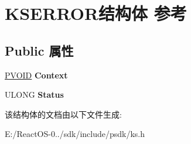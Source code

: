 \hypertarget{struct_k_s_e_r_r_o_r}{}\section{K\+S\+E\+R\+R\+O\+R结构体 参考}
\label{struct_k_s_e_r_r_o_r}
\subsection*{Public 属性}
\begin{DoxyCompactItemize}
\item 
\mbox{\label{struct_k_s_e_r_r_o_r_a802844a8d1ebb6cc20e209863befcc3e}} 
\hyperlink{interfacevoid}{P\+V\+O\+ID} {\bfseries Context}
\item 
\mbox{\label{struct_k_s_e_r_r_o_r_a476520f0a02ef6d4a4b8585c4e215b37}} 
U\+L\+O\+NG {\bfseries Status}
\end{DoxyCompactItemize}


该结构体的文档由以下文件生成\+:\begin{DoxyCompactItemize}
\item 
E\+:/\+React\+O\+S-\/0../sdk/include/psdk/ks.\+h\end{DoxyCompactItemize}
